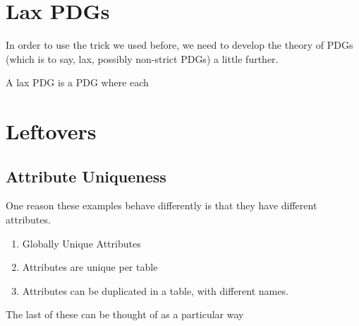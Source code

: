 \documentclass{article}
\theoremstyle{plain}
\theoremstyle{definition}
\theoremstyle{remark}
\begin{document}



\appendix

\section{Lax PDGs}\label{sec:laxpdg}
In order to use the trick we used before, we need to develop the theory of PDGs (which is to say, lax, possibly non-strict PDGs) a little further.
\begin{defn}
	A lax PDG is a PDG where each 
\end{defn}    


\section{Leftovers}

\subsection{Attribute Uniqueness}

One reason these examples behave differently is that they have different attributes.

\begin{enumerate}[nosep]
	\item Globally Unique Attributes
	\item Attributes are unique per table
	\item Attributes can be duplicated in a table, with different names.
\end{enumerate}

The last of these can be thought of as a particular way 
\end{document}

